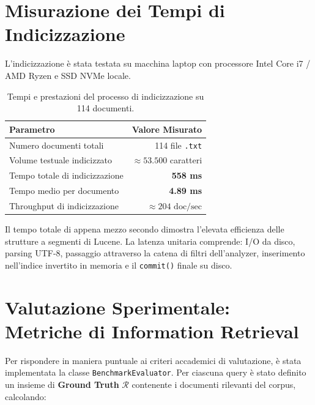 \documentclass[11pt,a4paper]{article}
\begin{document}
\section{Misurazione dei Tempi di Indicizzazione}
L'indicizzazione è stata testata su macchina laptop con processore Intel Core i7 / AMD Ryzen e SSD NVMe locale.

\begin{table}[htbp]
\centering
\small
\begin{tabular}{lr}
\toprule
\textbf{Parametro} & \textbf{Valore Misurato} \\
\midrule
Numero documenti totali & 114 file \texttt{.txt} \\
Volume testuale indicizzato & $\approx 53.500$ caratteri \\
Tempo totale di indicizzazione & \textbf{558 ms} \\
Tempo medio per documento & \textbf{4.89 ms} \\
Throughput di indicizzazione & $\approx 204\text{ doc/sec}$ \\
\bottomrule
\end{tabular}
\caption{Tempi e prestazioni del processo di indicizzazione su 114 documenti.}
\label{tab:indexing_perf}
\end{table}

Il tempo totale di appena mezzo secondo dimostra l'elevata efficienza delle strutture a segmenti di Lucene. La latenza unitaria comprende: I/O da disco, parsing UTF-8, passaggio attraverso la catena di filtri dell'analyzer, inserimento nell'indice invertito in memoria e il \texttt{commit()} finale su disco.

\section{Valutazione Sperimentale: Metriche di Information Retrieval}
Per rispondere in maniera puntuale ai criteri accademici di valutazione, è stata implementata la classe \texttt{BenchmarkEvaluator}. Per ciascuna query è stato definito un insieme di \textbf{Ground Truth} $\mathcal{R}$ contenente i documenti rilevanti del corpus, calcolando:
\end{document}
